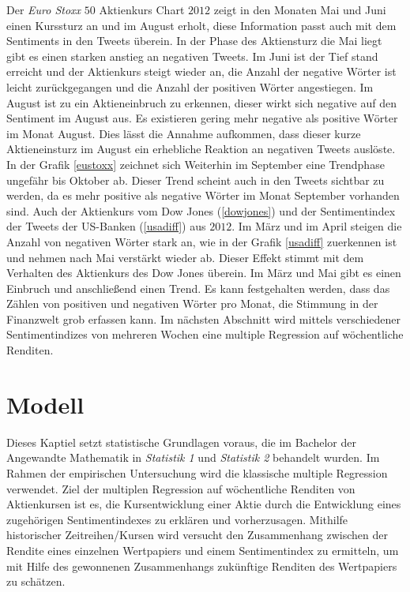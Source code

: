 Der \textit{Euro Stoxx} $50$ Aktienkurs Chart $2012$ zeigt in den Monaten Mai und Juni einen Kurssturz an und im August erholt, diese Information passt auch mit dem Sentiments in den Tweets überein. In der Phase des Aktiensturz  die Mai liegt gibt es einen starken anstieg an negativen Tweets. Im Juni ist der Tief stand erreicht und der Aktienkurs steigt wieder an, die Anzahl der negative Wörter ist leicht zurückgegangen und die Anzahl der positiven Wörter angestiegen. Im August ist zu ein Aktieneinbruch zu erkennen, dieser wirkt sich negative auf den Sentiment im August aus. Es existieren gering mehr negative als positive Wörter im Monat August. Dies lässt die Annahme aufkommen, dass dieser kurze Aktieneinsturz im August ein erhebliche Reaktion an negativen Tweets auslöste. In der Grafik \ref{eustoxx} zeichnet sich Weiterhin im September eine Trendphase ungefähr bis Oktober ab. Dieser Trend scheint auch in den Tweets sichtbar zu werden, da es mehr positive als negative Wörter im Monat September vorhanden sind. Auch der Aktienkurs vom Dow Jones (\ref{dowjones}) und der Sentimentindex der Tweets der US-Banken (\ref{usadiff}) aus $2012$. Im März und im April steigen die Anzahl von negativen Wörter stark an, wie in der Grafik \ref{usadiff} zuerkennen ist und nehmen nach Mai verstärkt wieder ab. Dieser Effekt stimmt mit dem Verhalten des Aktienkurs des Dow Jones überein. Im März und Mai gibt es einen Einbruch und anschließend einen Trend. Es kann festgehalten werden, dass das Zählen von positiven und negativen Wörter pro Monat, die Stimmung in der Finanzwelt grob erfassen kann. Im nächsten Abschnitt wird mittels verschiedener Sentimentindizes von mehreren Wochen eine multiple Regression auf wöchentliche Renditen.
\section{Modell} 

Dieses Kaptiel setzt statistische Grundlagen voraus, die im Bachelor der Angewandte Mathematik in \textit{Statistik 1} und \textit{Statistik 2} behandelt wurden. 
Im Rahmen der empirischen Untersuchung wird die klassische multiple Regression verwendet. Ziel der multiplen Regression auf wöchentliche Renditen von Aktienkursen ist es, die Kursentwicklung einer Aktie durch die Entwicklung eines zugehörigen Sentimentindexes zu erklären und vorherzusagen. Mithilfe historischer Zeitreihen/Kursen wird versucht den Zusammenhang zwischen der Rendite eines einzelnen Wertpapiers und einem Sentimentindex zu ermitteln, um mit Hilfe des gewonnenen Zusammenhangs zukünftige Renditen des Wertpapiers zu schätzen. \\


